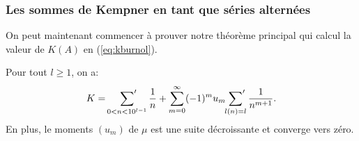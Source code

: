 \subsubsection{Les sommes de Kempner en tant que séries alternées}
On peut maintenant commencer à prouver notre théorème principal qui calcul la
valeur de $K(A)$ en (\ref{eq:kburnol}).
\begin{thm}
	Pour tout $l \ge 1$, on a:
	\begin{equation}
		K = \sideset{}{'}\sum_{0<n<10^{l-1}} \frac{1}{n} + \sum_{m=0}^{\infty} (-1)^{m}u_{m} \sideset{}{'}\sum_{l(n)=l} \frac{1}{n^{m+1}}.
		\label{eq:thm4burnol}
	\end{equation}
	En plus, le moments $(u_{m})$ de $\mu$ est une suite décroissante et converge vers zéro.
	\label{thm:maineqburnol}
\end{thm}
